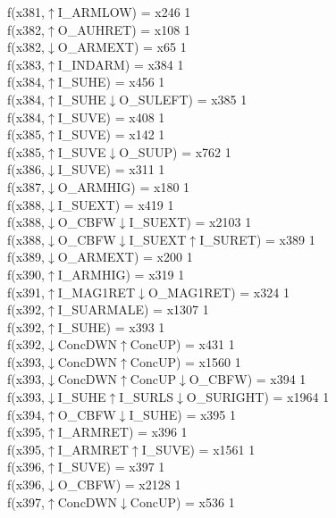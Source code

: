 f(x381,$\uparrow$I\_ARMLOW) = x246 {1} \\
f(x382,$\uparrow$O\_AUHRET) = x108 {1} \\
f(x382,$\downarrow$O\_ARMEXT) = x65 {1} \\
f(x383,$\uparrow$I\_INDARM) = x384 {1} \\
f(x384,$\uparrow$I\_SUHE) = x456 {1} \\
f(x384,$\uparrow$I\_SUHE$\downarrow$O\_SULEFT) = x385 {1} \\
f(x384,$\uparrow$I\_SUVE) = x408 {1} \\
f(x385,$\uparrow$I\_SUVE) = x142 {1} \\
f(x385,$\uparrow$I\_SUVE$\downarrow$O\_SUUP) = x762 {1} \\
f(x386,$\downarrow$I\_SUVE) = x311 {1} \\
f(x387,$\downarrow$O\_ARMHIG) = x180 {1} \\
f(x388,$\downarrow$I\_SUEXT) = x419 {1} \\
f(x388,$\downarrow$O\_CBFW$\downarrow$I\_SUEXT) = x2103 {1} \\
f(x388,$\downarrow$O\_CBFW$\downarrow$I\_SUEXT$\uparrow$I\_SURET) = x389 {1} \\
f(x389,$\downarrow$O\_ARMEXT) = x200 {1} \\
f(x390,$\uparrow$I\_ARMHIG) = x319 {1} \\
f(x391,$\uparrow$I\_MAG1RET$\downarrow$O\_MAG1RET) = x324 {1} \\
f(x392,$\uparrow$I\_SUARMALE) = x1307 {1} \\
f(x392,$\uparrow$I\_SUHE) = x393 {1} \\
f(x392,$\downarrow$ConcDWN$\uparrow$ConcUP) = x431 {1} \\
f(x393,$\downarrow$ConcDWN$\uparrow$ConcUP) = x1560 {1} \\
f(x393,$\downarrow$ConcDWN$\uparrow$ConcUP$\downarrow$O\_CBFW) = x394 {1} \\
f(x393,$\downarrow$I\_SUHE$\uparrow$I\_SURLS$\downarrow$O\_SURIGHT) = x1964 {1} \\
f(x394,$\uparrow$O\_CBFW$\downarrow$I\_SUHE) = x395 {1} \\
f(x395,$\uparrow$I\_ARMRET) = x396 {1} \\
f(x395,$\uparrow$I\_ARMRET$\uparrow$I\_SUVE) = x1561 {1} \\
f(x396,$\uparrow$I\_SUVE) = x397 {1} \\
f(x396,$\downarrow$O\_CBFW) = x2128 {1} \\
f(x397,$\uparrow$ConcDWN$\downarrow$ConcUP) = x536 {1} \\
